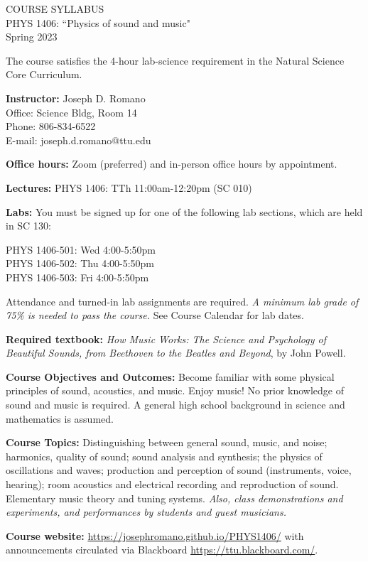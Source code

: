 \documentclass[11pt]{NSF}
\begin{document}
\begin{center}
COURSE SYLLABUS\\
PHYS 1406: ``Physics of sound and music"\\
Spring 2023
\end{center}

The course satisfies the 4-hour lab-science requirement in the Natural Science Core Curriculum.

{\bf Instructor:}
Joseph D. Romano\\
Office: Science Bldg, Room 14\\
Phone: 806-834-6522\\
E-mail: joseph.d.romano@ttu.edu

{\bf Office hours:}
Zoom (preferred) and in-person office hours by appointment.

{\bf Lectures:}
PHYS 1406: TTh 11:00am-12:20pm (SC 010)

{\bf Labs:} You must be signed up for one of the following lab
sections, which are held in SC 130:

PHYS 1406-501: Wed 4:00-5:50pm\\
PHYS 1406-502: Thu 4:00-5:50pm\\
PHYS 1406-503: Fri 4:00-5:50pm

Attendance and turned-in lab assignments are required.
\emph{A minimum lab grade of 75\% is needed to pass the course.}
See Course Calendar for lab dates.

{\bf Required textbook:}
{\em How Music Works: The Science and Psychology of Beautiful Sounds, 
from Beethoven to the Beatles and Beyond}, by John Powell.

{\bf Course Objectives and Outcomes:}
Become familiar with some physical principles of sound, acoustics, and music. 
Enjoy music!
No prior knowledge of sound and music is required. 
A general high school background in science and mathematics is assumed.

{\bf Course Topics:} 
Distinguishing between general sound, music, and noise;
harmonics, quality of sound; sound analysis and synthesis;
the physics of oscillations and waves;
production and perception of sound (instruments, voice, hearing);
room acoustics and electrical recording and reproduction of sound.
Elementary music theory and tuning systems.
{\em Also, class demonstrations and experiments, and performances by 
students and guest musicians.}

{\bf Course website:}
\url{https://josephromano.github.io/PHYS1406/} with announcements
circulated via Blackboard \url{https://ttu.blackboard.com/}.
\end{document}
